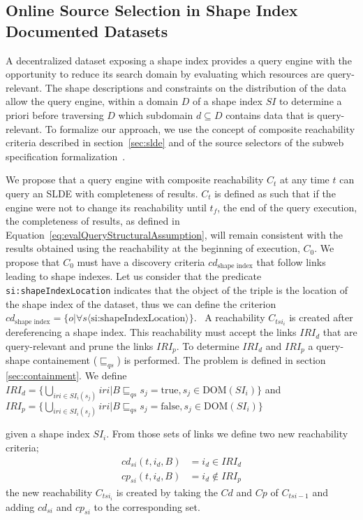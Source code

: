 \subsection{Online Source Selection in Shape Index Documented Datasets}

A decentralized dataset exposing a shape index provides a query engine with the opportunity to reduce its search domain by evaluating which resources are query-relevant.
The shape descriptions and constraints on the distribution of the data allow the query engine, 
within a domain $D$ of a shape index $SI$ to determine a priori before traversing $D$ which subdomain $d \subseteq D$ contains data that is query-relevant.
To formalize our approach, we use the concept of composite reachability criteria described in section~\ref{sec:slde} and of the source selectors of the subweb specification formalization~\cite{Bogaerts2021LinkTW, Taelman2023}.

We propose that a query engine with composite reachability $C_t$ at any time $t$ can query an SLDE with completeness of results.
$C_t$ is defined as such that if the engine were not to change its reachability
until $t_f$, the end of the query execution, the completeness of results,
as defined in Equation~\ref{eq:evalQueryStructuralAssumption},
will remain consistent with the results obtained using the reachability at the beginning of execution, $C_{0}$.
We propose that $C_0$ must have a discovery criteria $cd_{\text{shape index}}$ that follow links leading to shape indexes.
Let us consider that the predicate \texttt{si:shapeIndexLocation} indicates that the object of the triple is the location of the shape index 
of the dataset, thus we can define the criterion
$cd_{\text{shape index}} = \{o|\forall s \langle \text{si:shapeIndexLocation} \rangle \}$.~
A reachability $C_{tsi_i}$ is created after dereferencing a shape index.
This reachability must accept the links $IRI_d$ that are query-relevant and prune the links $IRI_p$.
To determine $IRI_d$ and $IRI_p$ a query-shape containement ($\sqsubseteq_{qs}$) is performed.
The problem is defined in section \ref{sec:containment}.
We define 
$IRI_d = \{ \bigcup_{iri \in SI_i(s_j)} iri |  B \sqsubseteq_{qs}  s_j = \mathrm{true}, s_j \in \text{DOM}(SI_i) \}$ and 
$IRI_p = \{ \bigcup_{iri \in SI_i(s_j)} iri | B \sqsubseteq_{qs}  s_j = \mathrm{false}, s_j \in \text{DOM}(SI_i) \}$

given a shape index $SI_i$.
From those sets of links we define two new reachability criteria;
\begin{equation}
   \begin{aligned}
       cd_{si}(t, i_d, B) &= i_d \in IRI_d \\
       cp_{si}(t, i_d, B) &= i_d \notin IRI_p
   \end{aligned}
\end{equation}
the new reachability $C_{tsi_i}$ is created by taking the $Cd$ and $Cp$ of $C_{tsi - 1}$ and adding
$cd_{si}$ and $cp_{si}$ to the corresponding set. 

